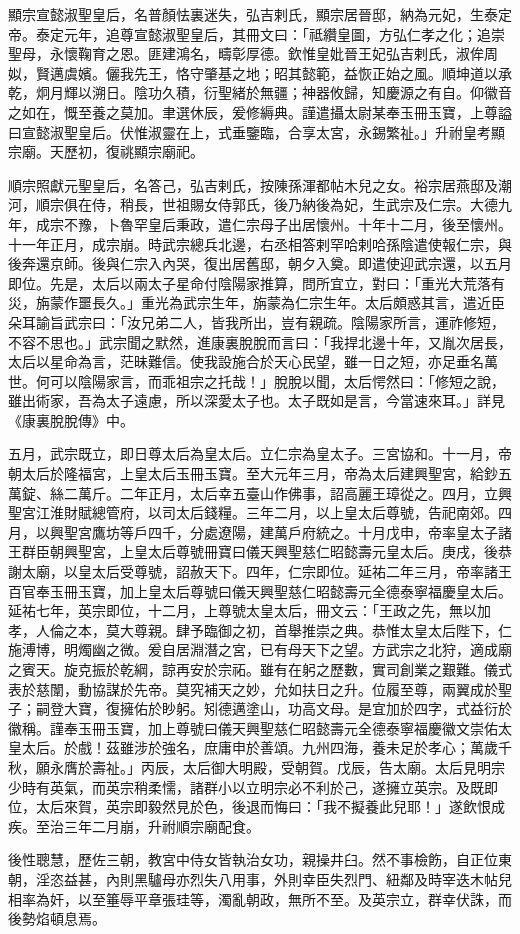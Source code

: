 \begin{pinyinscope}
 顯宗宣懿淑聖皇后，名普顏怯裏迷失，弘吉剌氏，顯宗居晉邸，納為元妃，生泰定帝。泰定元年，追尊宣懿淑聖皇后，其冊文曰：「祗纘皇圖，方弘仁孝之化；追崇聖母，永懷鞠育之恩。匪建鴻名，疇彰厚德。欽惟皇妣晉王妃弘吉剌氏，淑侔周姒，賢邁虞嬪。儷我先王，恪守肇基之地；昭其懿範，益恢正始之風。順坤道以承乾，炯月輝以溯日。陰功久積，衍聖緒於無疆；神器攸歸，知慶源之有自。仰徽音之如在，慨至養之莫加。聿選休辰，爰修縟典。謹遣攝太尉某奉玉冊玉寶，上尊謚曰宣懿淑聖皇后。伏惟淑靈在上，式垂鑒臨，合享太宮，永錫繁祉。」升祔皇考顯宗廟。天歷初，復祧顯宗廟祀。



 順宗照獻元聖皇后，名答己，弘吉剌氏，按陳孫渾都帖木兒之女。裕宗居燕邸及潮河，順宗俱在侍，稍長，世祖賜女侍郭氏，後乃納後為妃，生武宗及仁宗。大德九年，成宗不豫，卜魯罕皇后秉政，遣仁宗母子出居懷州。十年十二月，後至懷州。十一年正月，成宗崩。時武宗總兵北邊，右丞相答剌罕哈剌哈孫陰遣使報仁宗，與後奔還京師。後與仁宗入內哭，復出居舊邸，朝夕入奠。即遣使迎武宗還，以五月即位。先是，太后以兩太子星命付陰陽家推算，問所宜立，對曰：「重光大荒落有災，旃蒙作噩長久。」重光為武宗生年，旃蒙為仁宗生年。太后頗惑其言，遣近臣朵耳諭旨武宗曰：「汝兄弟二人，皆我所出，豈有親疏。陰陽家所言，運祚修短，不容不思也。」武宗聞之默然，進康裏脫脫而言曰：「我捍北邊十年，又胤次居長，太后以星命為言，茫昧難信。使我設施合於天心民望，雖一日之短，亦足垂名萬世。何可以陰陽家言，而乖祖宗之托哉！」脫脫以聞，太后愕然曰：「修短之說，雖出術家，吾為太子遠慮，所以深愛太子也。太子既如是言，今當速來耳。」詳見《康裏脫脫傳》中。



 五月，武宗既立，即日尊太后為皇太后。立仁宗為皇太子。三宮協和。十一月，帝朝太后於隆福宮，上皇太后玉冊玉寶。至大元年三月，帝為太后建興聖宮，給鈔五萬錠、絲二萬斤。二年正月，太后幸五臺山作佛事，詔高麗王璋從之。四月，立興聖宮江淮財賦總管府，以司太后錢糧。三年二月，以上皇太后尊號，告祀南郊。四月，以興聖宮鷹坊等戶四千，分處遼陽，建萬戶府統之。十月戊申，帝率皇太子諸王群臣朝興聖宮，上皇太后尊號冊寶曰儀天興聖慈仁昭懿壽元皇太后。庚戌，後恭謝太廟，以皇太后受尊號，詔赦天下。四年，仁宗即位。延祐二年三月，帝率諸王百官奉玉冊玉寶，加上皇太后尊號曰儀天興聖慈仁昭懿壽元全德泰寧福慶皇太后。延祐七年，英宗即位，十二月，上尊號太皇太后，冊文云：「王政之先，無以加孝，人倫之本，莫大尊親。肆予臨御之初，首舉推崇之典。恭惟太皇太后陛下，仁施溥博，明燭幽之微。爰自居淵潛之宮，已有母天下之望。方武宗之北狩，適成廟之賓天。旋克振於乾綱，諒再安於宗祏。雖有在躬之歷數，實司創業之艱難。儀式表於慈闈，動協謀於先帝。莫究補天之妙，允如扶日之升。位履至尊，兩翼成於聖子；嗣登大寶，復擁佑於眇躬。矧德邁塗山，功高文母。是宜加於四字，式益衍於徽稱。謹奉玉冊玉寶，加上尊號曰儀天興聖慈仁昭懿壽元全德泰寧福慶徽文崇佑太皇太后。於戲！茲雖涉於強名，庶庸申於善頌。九州四海，養未足於孝心；萬歲千秋，願永膺於壽祉。」丙辰，太后御大明殿，受朝賀。戊辰，告太廟。太后見明宗少時有英氣，而英宗稍柔懦，諸群小以立明宗必不利於己，遂擁立英宗。及既即位，太后來賀，英宗即毅然見於色，後退而悔曰：「我不擬養此兒耶！」遂飲恨成疾。至治三年二月崩，升祔順宗廟配食。



 後性聰慧，歷佐三朝，教宮中侍女皆執治女功，親操井臼。然不事檢飭，自正位東朝，淫恣益甚，內則黑驢母亦烈失八用事，外則幸臣失烈門、紐鄰及時宰迭木帖兒相率為奸，以至箠辱平章張珪等，濁亂朝政，無所不至。及英宗立，群幸伏誅，而後勢焰頓息焉。



\end{pinyinscope}